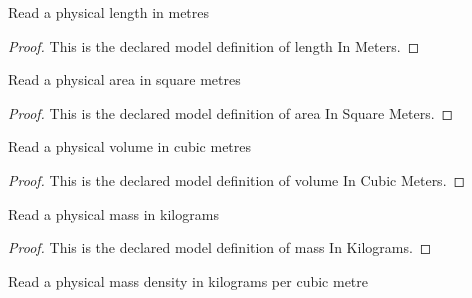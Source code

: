 \begin{definition}
  \label{def:physics:phyx-mini-0457:phyxminiproblems-problemphyxmini0457-lengthinmeters}
  Read a physical length in metres
\end{definition}
\begin{proof}
  This is the declared model definition of length In Meters.
\end{proof}
\begin{definition}
  \label{def:physics:phyx-mini-0457:phyxminiproblems-problemphyxmini0457-areainsquaremeters}
  Read a physical area in square metres
\end{definition}
\begin{proof}
  This is the declared model definition of area In Square Meters.
\end{proof}
\begin{definition}
  \label{def:physics:phyx-mini-0457:phyxminiproblems-problemphyxmini0457-volumeincubicmeters}
  Read a physical volume in cubic metres
\end{definition}
\begin{proof}
  This is the declared model definition of volume In Cubic Meters.
\end{proof}
\begin{definition}
  \label{def:physics:phyx-mini-0457:phyxminiproblems-problemphyxmini0457-massinkilograms}
  Read a physical mass in kilograms
\end{definition}
\begin{proof}
  This is the declared model definition of mass In Kilograms.
\end{proof}
\begin{definition}
  \label{def:physics:phyx-mini-0457:phyxminiproblems-problemphyxmini0457-densityinkilogramspercubicmeter}
  Read a physical mass density in kilograms per cubic metre
\end{definition}
